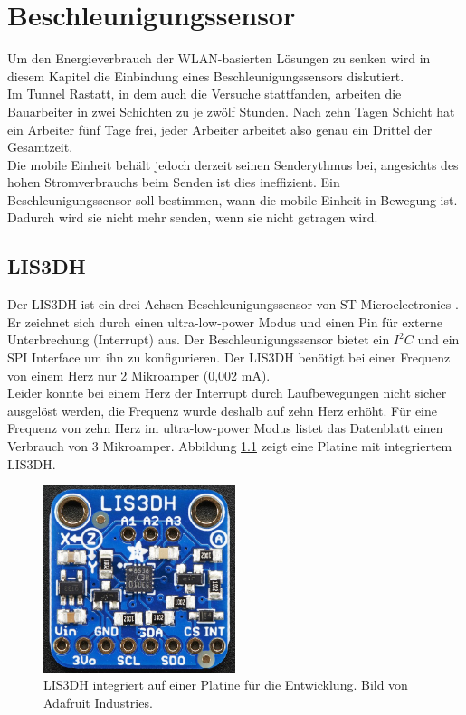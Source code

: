 \chapter{Beschleunigungssensor}
\label{ch:Beschleunigungssensor}
Um den Energieverbrauch der WLAN-basierten Lösungen zu senken wird in diesem Kapitel die Einbindung eines Beschleunigungssensors diskutiert. \\
Im Tunnel Rastatt, in dem auch die Versuche stattfanden, arbeiten die Bauarbeiter in zwei Schichten zu je zwölf Stunden. 
Nach zehn Tagen Schicht hat ein Arbeiter fünf Tage frei, jeder Arbeiter arbeitet also genau ein Drittel der Gesamtzeit. \\
Die mobile Einheit behält jedoch derzeit seinen Senderythmus bei, angesichts des hohen Stromverbrauchs beim Senden ist dies ineffizient.
Ein Beschleunigungssensor soll bestimmen, wann die mobile Einheit in Bewegung ist. 
Dadurch wird sie nicht mehr senden, wenn sie nicht getragen wird.

\section{LIS3DH}
Der LIS3DH ist ein drei Achsen Beschleunigungssensor von ST Microelectronics \cite{st2015lis}.
Er zeichnet sich durch einen ultra-low-power Modus und einen Pin für externe Unterbrechung (Interrupt) aus.
Der Beschleunigungssensor bietet ein $I^2C$ und ein SPI Interface um ihn zu konfigurieren.
Der LIS3DH benötigt bei einer Frequenz von einem Herz nur 2 Mikroamper (0,002 mA).\\
Leider konnte bei einem Herz der Interrupt durch Laufbewegungen nicht sicher ausgelöst werden, die Frequenz wurde deshalb auf zehn Herz erhöht.
Für eine Frequenz von zehn Herz im ultra-low-power Modus listet das Datenblatt einen Verbrauch von 3 Mikroamper.
Abbildung \ref{fig:lis3dh} zeigt eine Platine mit integriertem LIS3DH.

\begin{figure}[h]
  \centering
	\includegraphics[width=0.5\textwidth]{images/lis3dhada.png}
  \caption{LIS3DH integriert auf einer Platine für die Entwicklung. Bild von Adafruit Industries.}
  \label{fig:lis3dh}
\end{figure}

